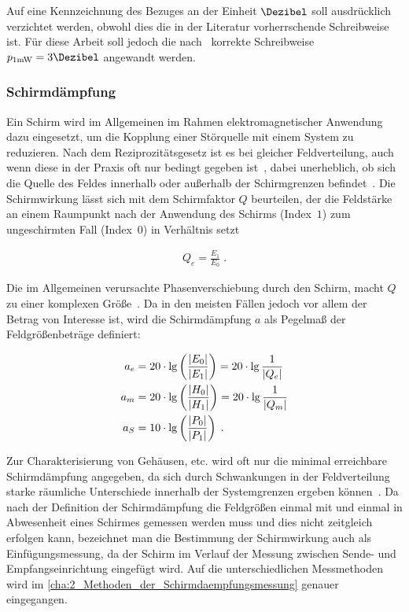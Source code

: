 Auf eine Kennzeichnung des Bezuges an der Einheit $\si{\Dezibel}$ soll ausdrücklich verzichtet werden, obwohl dies die in der Literatur vorherrschende Schreibweise ist. Für diese Arbeit soll jedoch die nach~\cite{IEC60027-3} korrekte Schreibweise $p_{1 \si{\milli\watt}} = 3 \si{\Dezibel}$ angewandt werden. 


\subsubsection{Schirmdämpfung}\label{cha:2_subsub_Schirmdaempfung}

Ein Schirm wird im Allgemeinen im Rahmen elektromagnetischer Anwendung dazu eingesetzt, um die Kopplung einer Störquelle mit einem System zu reduzieren. Nach dem Reziprozitätsgesetz ist es bei gleicher Feldverteilung, auch wenn diese in der Praxis oft nur bedingt gegeben ist~\cite{EMV-gerechtes_Geraetedesign}, dabei unerheblich, ob sich die Quelle des Feldes innerhalb oder außerhalb der Schirmgrenzen befindet~\cite{EM_Schirmung}. Die Schirmwirkung lässt sich mit dem Schirmfaktor $Q$ beurteilen, der die Feldstärke an einem Raumpunkt nach der Anwendung des Schirms (Index~\glqq$1$\grqq) zum ungeschirmten Fall (Index~\glqq$0$\grqq) in Verhältnis setzt~\cite{EM_Schirmung}

\begin{align}
    Q_e = \frac{E_1}{E_0} \; \text{.}
\end{align}

\par
\vspace{\linespace}
Die im Allgemeinen verursachte Phasenverschiebung durch den Schirm, macht $Q$ zu einer komplexen Größe~\cite{EM_Schirmung}. Da in den meisten Fällen jedoch vor allem der Betrag von Interesse ist, wird die Schirmdämpfung $a$ als Pegelmaß der Feldgrößenbeträge definiert:

\begin{align}
    a_e &= 20 \cdot \lg \left(\frac{\lvert E_0\rvert}{\lvert E_1\rvert}\right) = 20 \cdot \lg \frac{1}{\lvert Q_e\rvert} \label{eq:2_Schirmdaempfung_elektrisch}\\
    a_m &= 20 \cdot \lg \left(\frac{\lvert H_0\rvert}{\lvert H_1\rvert}\right) = 20 \cdot \lg \frac{1}{\lvert Q_m\rvert} \label{eq:2_Schirmdaempfung_magnetisch}\\
    a_S &= 10 \cdot \lg \left(\frac{\lvert P_0\rvert}{\lvert P_1\rvert}\right) \; \text{.} \label{eq:2_Schirmdaempfung_Leistung}
\end{align}

Zur Charakterisierung von Gehäusen, etc. wird oft nur die minimal erreichbare Schirmdämpfung angegeben, da sich durch Schwankungen in der Feldverteilung starke räumliche Unterschiede innerhalb der Systemgrenzen ergeben können~\cite{EM_Schirmung}. Da nach der Definition der Schirmdämpfung die Feldgrößen einmal mit und einmal in Abwesenheit eines Schirmes gemessen werden muss und dies nicht zeitgleich erfolgen kann, bezeichnet man die Bestimmung der Schirmwirkung auch als Einfügungsmessung, da der Schirm im Verlauf der Messung zwischen Sende- und Empfangseinrichtung eingefügt wird. Auf die unterschiedlichen Messmethoden wird im \Abschnitt\ref{cha:2_Methoden_der_Schirmdaempfungsmessung} genauer eingegangen.


